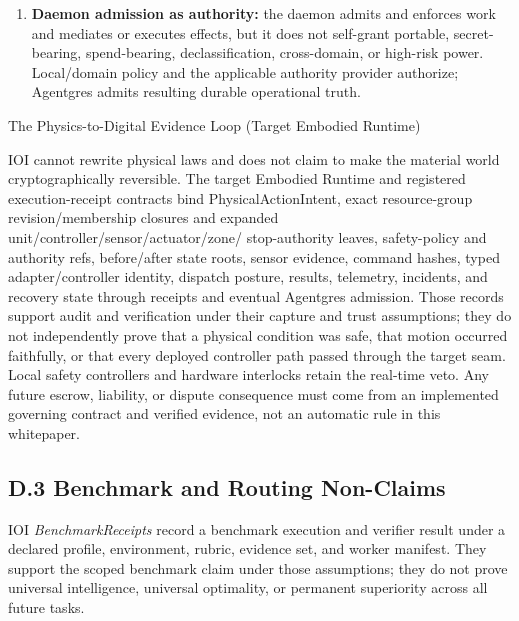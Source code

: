 \documentclass[
  11pt,
]{article}
\begin{document}
\begin{enumerate}
  workspace, Worker, or provider environment does not prove that an external API,
  payment, message, deployment, or physical action did or did not commit.
  Consequential effects declare \texttt{replayable},
  \texttt{checkpointable}, \texttt{compensatable},
  \texttt{reconciliation\_required}, or \texttt{non\_retryable}; ambiguous
  effects are reconciled before retry, and compensation is separately
  authorized and receipted.
\item
  \textbf{Daemon admission as authority:} the daemon admits and enforces work
  and mediates or executes effects, but it does not self-grant portable,
  secret-bearing, spend-bearing, declassification, cross-domain, or high-risk
  power. Local/domain policy and the applicable authority provider authorize;
  Agentgres admits resulting durable operational truth.
\end{enumerate}

The Physics-to-Digital Evidence Loop (Target Embodied Runtime)

IOI cannot rewrite physical laws and does not claim to make the material
world cryptographically reversible. The target Embodied Runtime and registered
execution-receipt contracts bind PhysicalActionIntent, exact resource-group
revision/membership closures and expanded unit/controller/sensor/actuator/zone/
stop-authority leaves, safety-policy and authority refs, before/after state
roots, sensor evidence, command hashes, typed adapter/controller identity,
dispatch posture, results, telemetry, incidents, and recovery state through
receipts and eventual Agentgres admission. Those records support audit and
verification under their capture and trust assumptions; they do not
independently prove that a physical condition was safe, that motion occurred
faithfully, or that every deployed controller path passed through the
target seam. Local safety controllers and hardware interlocks retain the
real-time veto. Any future escrow, liability, or dispute consequence must come
from an implemented governing contract and verified evidence, not an automatic
rule in this whitepaper.

\hypertarget{d.3-benchmark-and-routing-non-claims}{%
\subsection{D.3 Benchmark and Routing
Non-Claims}\label{d.3-benchmark-and-routing-non-claims}}

IOI \emph{BenchmarkReceipts} record a benchmark execution and verifier
result under a declared profile, environment, rubric, evidence set, and
worker manifest. They support the scoped benchmark claim under those
assumptions; they do not prove universal intelligence, universal optimality,
or permanent superiority across all future tasks.
\end{document}
